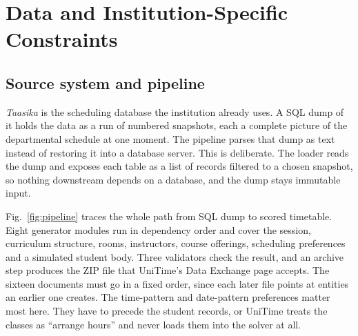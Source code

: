 \documentclass[journal]{IEEEtran}
\begin{document}
\section{Data and Institution-Specific Constraints}
\label{sec:data}

\subsection{Source system and pipeline}
\emph{Taasika} is the scheduling database the institution already uses. A SQL dump of it holds the data as a run of numbered snapshots, each a complete picture of the departmental schedule at one moment. The pipeline parses that dump as text instead of restoring it into a database server. This is deliberate. The loader reads the dump and exposes each table as a list of records filtered to a chosen snapshot, so nothing downstream depends on a database, and the dump stays immutable input.

Fig.~\ref{fig:pipeline} traces the whole path from SQL dump to scored timetable. Eight generator modules run in dependency order and cover the session, curriculum structure, rooms, instructors, course offerings, scheduling preferences and a simulated student body. Three validators check the result, and an archive step produces the ZIP file that UniTime's Data Exchange page accepts. The sixteen documents must go in a fixed order, since each later file points at entities an earlier one creates. The time-pattern and date-pattern preferences matter most here. They have to precede the student records, or UniTime treats the classes as ``arrange hours'' and never loads them into the solver at all.
\end{document}
